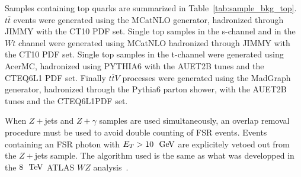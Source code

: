 Samples containing top quarks are summarized in Table~\ref{tab:sample_bkg_top}. $t\bar{t}$ events were generated using the MCatNLO\cite{MCatNLO} generator, hadronized through JIMMY with the CT10 PDF set. Single top samples in the s-channel and in the $Wt$ channel were generated using MCatNLO hadronized through JIMMY with the CT10 PDF set. Single top samples in the t-channel were generated using AcerMC\cite{Kersevan:2004yg}, hadronized using PYTHIA6 with the AUET2B tunes and the CTEQ6L1 PDF set. Finally $t\bar{t}V$ processes were generated using the MadGraph generator, hadronized through the Pythia6 parton shower, with the AUET2B tunes and the CTEQ6L1PDF set.



When $Z+$jets and $Z+\gamma$ samples are used simultaneously, an overlap removal procedure must be used to avoid double counting of FSR events. Events containing an FSR photon with $E_{T}>10~\GeV$ are explicitely vetoed out from the $Z+$jets sample. The algorithm used is the same as what was developped in the $8~\TeV$ ATLAS $WZ$ analysis~\cite{Anger:1663539}.


